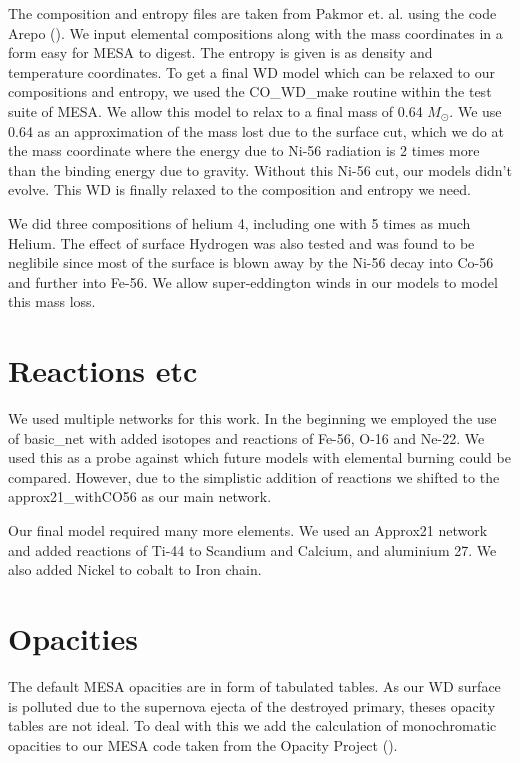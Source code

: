 \documentclass[fleqn,usenatbib]{mnras}
\begin{document}
The composition and entropy files are taken from Pakmor et. al. using the code Arepo (\cite{2020ApJS..248...32W}). We input  elemental compositions along with the mass coordinates in a form easy for MESA to digest. The entropy is given is as density and temperature coordinates. To get a final WD model which can be relaxed to our compositions and entropy, we used the CO\_WD\_make routine within the test suite of MESA. We allow this model to relax to a final mass of 0.64 $M_{\odot}$. We use 0.64 as an approximation of the mass lost due to the surface cut, which we do at the mass coordinate where the energy due to Ni-56 radiation is 2 times more than the binding energy due to gravity. Without this Ni-56 cut, our models didn't evolve. This WD is finally relaxed to the composition and entropy we need. 

We did three compositions of helium 4, including one with 5 times as much Helium. The effect of surface Hydrogen was also tested and was found to be neglibile since most of the surface is blown away by the Ni-56 decay into Co-56 and further into Fe-56. We allow super-eddington winds in our models to model this mass loss.


\section{Reactions etc}

We used multiple networks for this work. In the beginning we employed the use of basic\_net with added isotopes and reactions of Fe-56, O-16 and Ne-22. We used this as a probe against which future models with elemental burning could be compared. However, due to the simplistic addition of reactions we shifted to the approx21\_withCO56 as our main network.

Our final model required many more elements. We used an Approx21 network and added reactions of Ti-44 to Scandium and Calcium, and aluminium 27. We also added Nickel to cobalt to Iron chain. 

\section{Opacities}

The default MESA opacities are in form of tabulated tables. As our WD surface is polluted due to the supernova ejecta of the destroyed primary, theses opacity tables are not ideal. To deal with this we add the calculation of monochromatic opacities to our MESA code taken from the Opacity Project (\cite{paxton_bill_2011_4390522}). 
\end{document}
